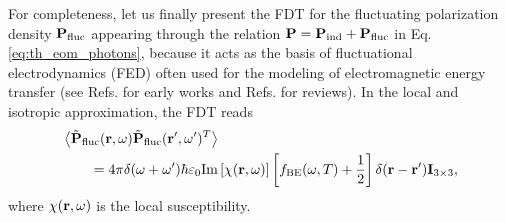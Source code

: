 For completeness, let us finally present the FDT for the fluctuating polarization density $\mathbf{P}_{\textrm{fluc}}$ appearing through the relation $\mathbf{P}=\mathbf{P}_{\textrm{ind}}+\mathbf{P}_{\textrm{fluc}}$ in Eq. \eqref{eq:th_eom_photons}, because it acts as the basis of fluctuational electrodynamics \cite{rytov,lifshitz55} (FED) often used for the modeling of electromagnetic energy transfer (see Refs. \cite{polder71,loomis94,pendry99,volokitin01} for early works and Refs. \cite{joulain05,volokitin07} for reviews). In the local and isotropic approximation, the FDT reads \cite{novotny}
\begin{alignat}{2}
 & \left\langle \tilde{\mathbf{P}}_{\textrm{fluc}}(\mathbf{r},\omega) \tilde{\mathbf{P}}_{\textrm{fluc}}(\mathbf{r}',\omega')^T\right\rangle \notag \\
 &\qquad = 4\pi \delta(\omega+\omega') \hbar \varepsilon_0 \textrm{Im}\left[ \chi(\mathbf{r},\omega)\right] \left[f_{\textrm{BE}}(\omega,T)+\frac{1}{2}\right] \delta(\mathbf{r}-\mathbf{r}') \mathbf{I}_{3 \times 3}, \label{eq:th_PflucPfluc}
\end{alignat}
where $\chi(\mathbf{r},\omega)$ is the local susceptibility. %


